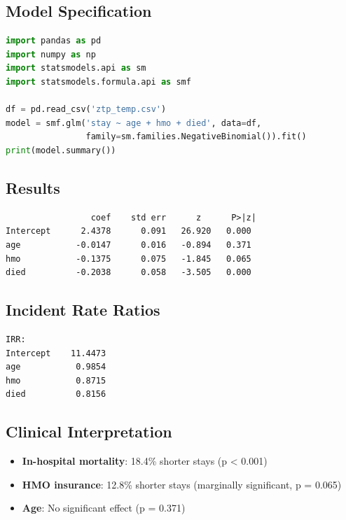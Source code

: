 \documentclass[12pt, a4paper]{article}
\begin{document}
\subsection*{Model Specification}

\begin{lstlisting}[language=Python]
import pandas as pd
import numpy as np
import statsmodels.api as sm
import statsmodels.formula.api as smf

df = pd.read_csv('ztp_temp.csv')
model = smf.glm('stay ~ age + hmo + died', data=df,
                family=sm.families.NegativeBinomial()).fit()
print(model.summary())
\end{lstlisting}

\subsection*{Results}

\begin{outputbox}
\begin{verbatim}
                 coef    std err      z      P>|z|
Intercept      2.4378      0.091   26.920   0.000
age           -0.0147      0.016   -0.894   0.371
hmo           -0.1375      0.075   -1.845   0.065
died          -0.2038      0.058   -3.505   0.000
\end{verbatim}
\end{outputbox}

\subsection*{Incident Rate Ratios}

\begin{outputbox}
\begin{verbatim}
IRR:
Intercept    11.4473
age           0.9854
hmo           0.8715
died          0.8156
\end{verbatim}
\end{outputbox}

\subsection*{Clinical Interpretation}

\begin{itemize}
    \item \textbf{In-hospital mortality}: 18.4\% shorter stays (p < 0.001)
    \item \textbf{HMO insurance}: 12.8\% shorter stays (marginally significant, p = 0.065)
    \item \textbf{Age}: No significant effect (p = 0.371)
\end{itemize}
\end{document}
